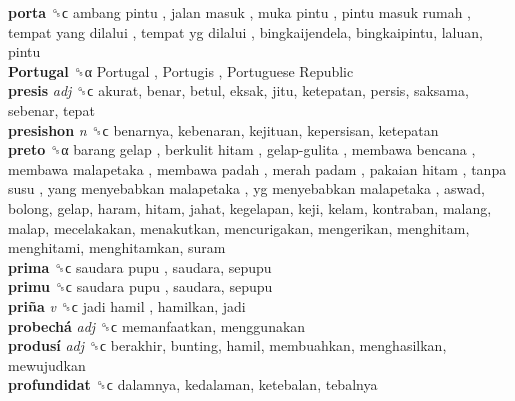\textbf{porta} ␝ϲ   ambang pintu ,  jalan masuk ,  muka pintu ,  pintu masuk rumah ,  tempat yang dilalui ,  tempat yg dilalui , bingkaijendela, bingkaipintu, laluan, pintu  \\
\textbf{Portugal} ␝α   Portugal ,  Portugis ,  Portuguese Republic   \\
\textbf{presis} \emph{adj}  ␝ϲ  akurat, benar, betul, eksak, jitu, ketepatan, persis, saksama, sebenar, tepat  \\
\textbf{presishon} \emph{n}  ␝ϲ  benarnya, kebenaran, kejituan, kepersisan, ketepatan  \\
\textbf{preto} ␝α   barang gelap ,  berkulit hitam ,  gelap-gulita ,  membawa bencana ,  membawa malapetaka ,  membawa padah ,  merah padam ,  pakaian hitam ,  tanpa susu ,  yang menyebabkan malapetaka ,  yg menyebabkan malapetaka , aswad, bolong, gelap, haram, hitam, jahat, kegelapan, keji, kelam, kontraban, malang, malap, mecelakakan, menakutkan, mencurigakan, mengerikan, menghitam, menghitami, menghitamkan, suram  \\
\textbf{prima} ␝ϲ   saudara pupu , saudara, sepupu  \\
\textbf{primu} ␝ϲ   saudara pupu , saudara, sepupu  \\
\textbf{priña} \emph{v}  ␝ϲ   jadi hamil , hamilkan, jadi  \\
\textbf{probechá} \emph{adj}  ␝ϲ  memanfaatkan, menggunakan  \\
\textbf{produsí} \emph{adj}  ␝ϲ  berakhir, bunting, hamil, membuahkan, menghasilkan, mewujudkan  \\
\textbf{profundidat} ␝ϲ  dalamnya, kedalaman, ketebalan, tebalnya  \\
